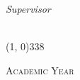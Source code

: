 \begin{titlepage}
\begin{center}
\begin{normalsize}
            \begin{flushright}
                \textit{Supervisor}\\
                \profTitle\ \myProf
            \end{flushright}
        \end{normalsize}

        \vspace*{\fill}
        
        \line(1, 0){338} \\
        \begin{normalsize}
            \textsc{Academic Year \myAA}
        \end{normalsize}
    \end{center}
\end{titlepage}

